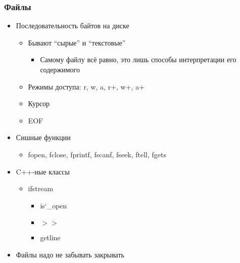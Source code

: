 \documentclass[xetex,mathserif,serif]{beamer}
\begin{document}
	\begin{frame}
		\frametitle{Файлы}
		\begin{itemize}
			\item Последовательность байтов на диске
			\begin{itemize}
				\item Бывают ``сырые'' и ``текстовые''
				\begin{itemize}
					\item Самому файлу всё равно, это лишь способы интерпретации его содержимого
				\end{itemize}
				\item Режимы доступа: r, w, a, r+, w+, a+
				\item Курсор
				\item EOF
			\end{itemize}
			\item Сишные функции
			\begin{itemize}
				\item fopen, fclose, fprintf, fscanf, fseek, ftell, fgets
			\end{itemize}
			\item C++-ные классы
			\begin{itemize}
				\item ifstream
				\begin{itemize}
					\item is\char`_open
					\item $>>$
					\item getline
				\end{itemize}
			\end{itemize}
			\item Файлы надо не забывать закрывать
		\end{itemize}
	\end{frame}
\end{document}
